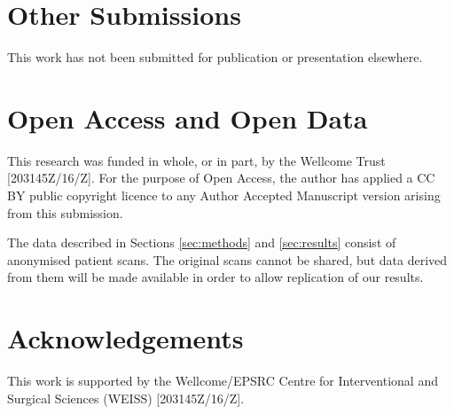 \section{Other Submissions}
This work has not been submitted for publication or presentation elsewhere.

\section{Open Access and Open Data}
This research was funded in whole, or in part, by the Wellcome Trust [203145Z/16/Z]. 
For the purpose of Open Access, the author has applied a CC BY public copyright licence to any Author Accepted Manuscript version arising from this submission.

The data described in Sections \ref{sec:methods} and \ref{sec:results} consist 
of anonymised patient scans. The original scans cannot be shared, but 
data derived from them will be made available in order to allow replication 
of our results.

\section{Acknowledgements}
This work is supported by the Wellcome/EPSRC Centre for Interventional and Surgical Sciences (WEISS) [203145Z/16/Z].


